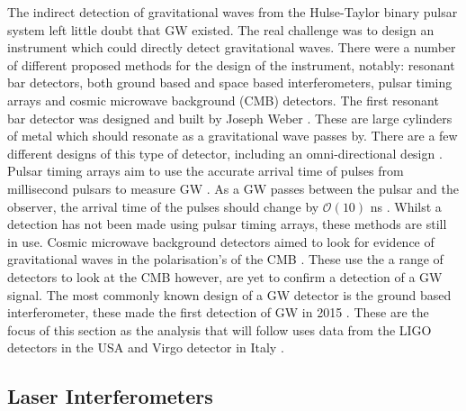 The indirect detection of gravitational waves from the Hulse-Taylor binary pulsar system left little doubt that \gls{GW} existed. 
The real challenge was to design an instrument which could directly detect gravitational waves.
There were a number of different proposed methods for the design of the instrument, notably: resonant bar detectors, both ground based and space based interferometers, pulsar timing arrays and cosmic microwave background (CMB) detectors. 
The first resonant bar detector was designed and built by Joseph Weber \citep{weber1966ObservationThermal}. 
These are large cylinders of metal which should resonate as a gravitational wave passes by. 
There are a few different designs of this type of detector, including an omni-directional design \citep{dewaard2003MiniGRAILFirst}. 
Pulsar timing arrays aim to use the accurate arrival time of pulses from millisecond pulsars to measure \gls{GW} \citep{hobbs2017GravitationalWave}. As a \gls{GW} passes between the pulsar and the observer, the arrival time of the pulses should change by $\mathcal{O}(10)$ ns \citep{hobbs2017GravitationalWave}. 
Whilst a detection has not been made using pulsar timing arrays, these methods are still in use.
Cosmic microwave background detectors aimed to look for evidence of gravitational waves in the polarisation's of the CMB \citep{ade2018ConstraintsPrimordial}.  
These use the a range of detectors to look at the CMB however, are yet to confirm a detection of a \gls{GW} signal.
The most commonly known design of a \gls{GW} detector is the ground based interferometer, these made the first detection of \gls{GW} in 2015 \citep{abbott2016ObservationGravitational}. 
These are the focus of this section as the analysis that will follow uses data from the \gls{LIGO} detectors in the USA \citep{abbott2009LIGOLaser,aasi2015AdvancedLIGO} and Virgo detector in Italy \citep{acernese2015AdvancedVirgo,acernese2008StatusVirgo}. 

\subsection{Laser Interferometers}

